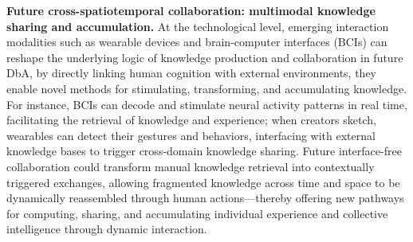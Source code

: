 \textbf{Future cross-spatiotemporal collaboration: multimodal knowledge sharing and accumulation.}
At the technological level, emerging interaction modalities such as wearable devices and brain-computer interfaces (BCIs) can reshape the underlying logic of knowledge production and collaboration in future DbA, by directly linking human cognition with external environments\cite{jensen2011using}, they enable novel methods for stimulating\cite{birbaumer2006physiological}, transforming, and accumulating knowledge. For instance, BCIs can decode and stimulate neural activity patterns in real time\cite{jensen2011using}, facilitating the retrieval of knowledge and experience\cite{moore2010applications}; when creators sketch, wearables can detect their gestures and behaviors, interfacing with external knowledge bases to trigger cross-domain knowledge sharing\cite{birbaumer2006physiological, gao2021interface, nicolas2012brain}. Future interface-free collaboration could transform manual knowledge retrieval into contextually triggered exchanges, allowing fragmented knowledge across time and space to be dynamically reassembled through human actions—thereby offering new pathways for computing, sharing, and accumulating individual experience and collective intelligence through dynamic interaction.  

